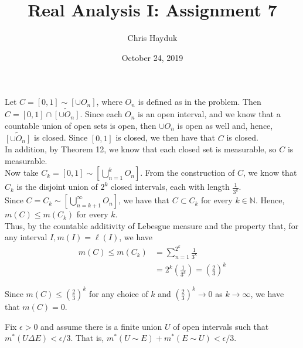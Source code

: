 \documentclass[12pt]{article}
\newenvironment{problem}[2][Problem]{\begin{trivlist}
\item[\hskip \labelsep {\bfseries #1}\hskip \labelsep {\bfseries #2.}]}{\end{trivlist}}
\begin{document}
\title{Real Analysis I: Assignment 7}

\author{Chris Hayduk}
\date{October 24, 2019}

\maketitle

\begin{problem}{1}
\end{problem}

Let $C = [0, 1] \sim [\cup O_n]$, where $O_n$ is defined as in the problem. Then $C = [0, 1] \cap \widetilde{[\cup O_n]}$. Since each $O_n$ is an open interval, and we know that a countable union of open sets is open, then $\cup O_n$ is open as well and, hence, $\widetilde{[\cup O_n]}$ is closed. Since $[0, 1]$ is closed, we then have that $C$ is closed.\\

In addition, by Theorem 12, we know that each closed set is measurable, so $C$ is measurable.\\

Now take $C_k = [0, 1] \sim [\bigcup_{n=1}^{k} O_n]$. From the construction of $C$, we know that $C_k$ is the disjoint union of $2^k$ closed intervals, each with length $\frac{1}{3^k}$.\\

Since $C = C_k \sim [\bigcup_{n=k+1}^{\infty} O_n]$, we have that $C \subset C_k$ for every $k \in \mathbb{N}$. Hence, $m(C) \leq m(C_k)$ for every $k$.\\

Thus, by the countable additivity of Lebesgue measure and the property that, for any interval $I, m(I) = \ell(I)$, we have
\begin{align*}
m(C) \leq m(C_k) &= \sum_{n=1}^{2^k} \frac{1}{3^k}\\
&= 2^k\left(\frac{1}{3^k}\right) = \left(\frac{2}{3}\right)^k
\end{align*}

Since $m(C) \leq \left(\frac{2}{3}\right)^k$ for any choice of $k$ and $\left(\frac{2}{3}\right)^k \to 0$ as $k \to \infty$, we have that $m(C) = 0$.

\begin{problem}{2}
\end{problem}

Fix $\epsilon > 0$ and assume there is a finite union $U$ of open intervals such that $m^*(U \Delta E) < \epsilon/3$. That is, $m^*(U \sim E) + m^*(E \sim U) < \epsilon/3$.\\
\end{document}
